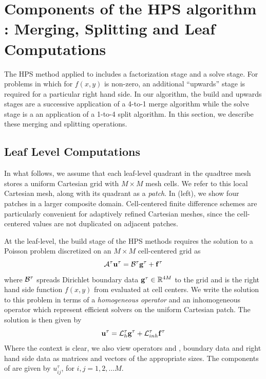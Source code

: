 \section{Components of the HPS algorithm : Merging, Splitting and Leaf Computations}
\label{sec:quadtree}
The HPS method applied to  includes a factorization stage and a solve stage. For problems in which for $f(x,y)$ is non-zero, an additional ``upwards'' stage is required for a particular right hand side.  In our algorithm, the build and upwards stages are a successive application of a 4-to-1 merge algorithm while the solve stage is a an application of a 1-to-4 split algorithm.  In this section, we describe these merging and splitting operations.


\subsection{Leaf Level Computations}
\label{sub:leaf_level_computations}

In what follows, we assume that each leaf-level quadrant in the quadtree mesh stores a uniform Cartesian grid with $M \times M$ mesh cells.  We refer to this local Cartesian mesh, along with its quadrant as a {\em patch}.  In  (left), we show four patches in a larger composite domain. Cell-centered finite difference schemes are particularly convenient for adaptively refined Cartesian meshes, since the cell-centered values are not duplicated on adjacent patches.

At the leaf-level, the build stage of the HPS methods requires the solution to a Poisson problem  discretized on an $M \times M$ cell-centered grid as
\begin{equation}
\mathcal A^{\tau} \mathbf u^{\tau} = \mathcal B^\tau \mathbf g^{\tau} + \mathbf f^{\tau}
\label{eq:patch_poisson_problem}
\end{equation}
where $\mathcal B^\tau$ spreads Dirichlet boundary data $\mathbf g^{\tau} \in \mathbb R^{4M}$ to the grid and \ftau is the right hand side function $f(x,y)$ from  evaluated at cell centers.  We write the solution to this problem in terms of a {\em homogeneous operator} \Lhtau and an inhomogeneous operator \Linhtau which represent efficient solvers on the uniform Cartesian patch. The solution is then given by 
\begin{equation}
\mathbf u^{\tau} = \mathcal L_h^{\tau} \mathbf g^{\tau} + \mathcal L_{inh}^{\tau} \mathbf f^{\tau}
\label{eq:patch_leaf_solve}
\end{equation}
Where the context is clear, we also view operators \Lhtau and \Linhtau, boundary data \gtau and right hand side data \ftau as matrices and vectors of the appropriate sizes. The components of \utau are given by $u^\tau_{ij}$, for $i,j = 1,2,\hdots M$.  

